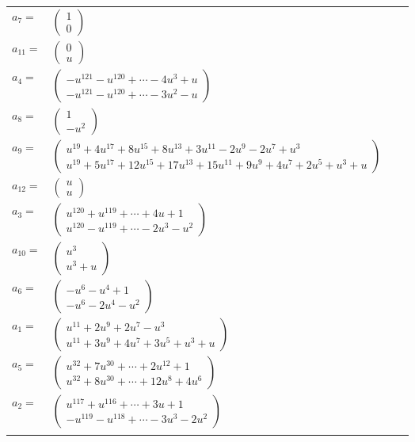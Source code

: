 \documentclass[1p]{elsarticle_modified}
\theoremstyle{definition}
\begin{document}
\begin{tabular}{m{7pt} m{180pt} m{7pt} m{180pt} }
\flushright $a_{7}=$&$\begin{pmatrix}1\\0\end{pmatrix}$ \\
\flushright $a_{11}=$&$\begin{pmatrix}0\\u\end{pmatrix}$ \\
\flushright $a_{4}=$&$\begin{pmatrix}- u^{121}- u^{120}+\cdots-4 u^3+u\\- u^{121}- u^{120}+\cdots-3 u^2- u\end{pmatrix}$ \\
\flushright $a_{8}=$&$\begin{pmatrix}1\\- u^2\end{pmatrix}$ \\
\flushright $a_{9}=$&$\begin{pmatrix}u^{19}+4 u^{17}+8 u^{15}+8 u^{13}+3 u^{11}-2 u^9-2 u^7+u^3\\u^{19}+5 u^{17}+12 u^{15}+17 u^{13}+15 u^{11}+9 u^9+4 u^7+2 u^5+u^3+u\end{pmatrix}$ \\
\flushright $a_{12}=$&$\begin{pmatrix}u\\u\end{pmatrix}$ \\
\flushright $a_{3}=$&$\begin{pmatrix}u^{120}+u^{119}+\cdots+4 u+1\\u^{120}- u^{119}+\cdots-2 u^3- u^2\end{pmatrix}$ \\
\flushright $a_{10}=$&$\begin{pmatrix}u^3\\u^3+u\end{pmatrix}$ \\
\flushright $a_{6}=$&$\begin{pmatrix}- u^6- u^4+1\\- u^6-2 u^4- u^2\end{pmatrix}$ \\
\flushright $a_{1}=$&$\begin{pmatrix}u^{11}+2 u^9+2 u^7- u^3\\u^{11}+3 u^9+4 u^7+3 u^5+u^3+u\end{pmatrix}$ \\
\flushright $a_{5}=$&$\begin{pmatrix}u^{32}+7 u^{30}+\cdots+2 u^{12}+1\\u^{32}+8 u^{30}+\cdots+12 u^8+4 u^6\end{pmatrix}$ \\
\flushright $a_{2}=$&$\begin{pmatrix}u^{117}+u^{116}+\cdots+3 u+1\\- u^{119}- u^{118}+\cdots-3 u^3-2 u^2\end{pmatrix}$\\&\end{tabular}
\end{document}
